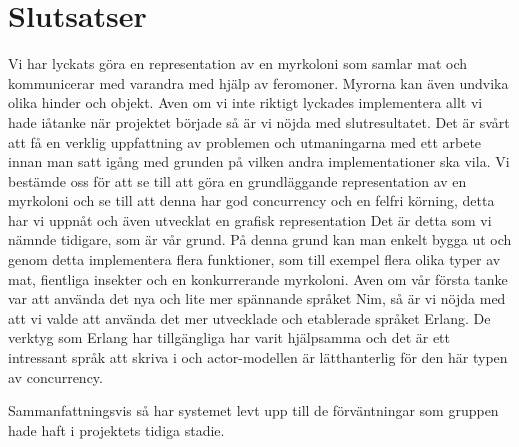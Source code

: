 \documentclass[12pt]{article}
\begin{document}
\section{Slutsatser}
Vi har lyckats göra en representation av en myrkoloni som samlar mat och kommunicerar med varandra med hjälp av feromoner.
Myrorna kan även undvika olika hinder och objekt.
Aven om vi inte riktigt lyckades implementera allt vi hade iåtanke när projektet började så är vi nöjda med slutresultatet.
Det är svårt att få en verklig uppfattning av problemen och utmaningarna med ett arbete innan man satt igång med grunden på vilken andra implementationer ska vila.
Vi bestämde oss för att se till att göra en grundläggande representation av en myrkoloni och se till att denna har god concurrency och en felfri körning,
detta har vi uppnåt och även utvecklat en grafisk representation Det är detta som vi nämnde tidigare, som är vår grund.
På denna grund kan man enkelt bygga ut och genom detta implementera flera funktioner,
som till exempel flera olika typer av mat, fientliga insekter och en konkurrerande myrkoloni.
Aven om vår första tanke var att använda det nya och lite mer spännande språket Nim,
så är vi nöjda med att vi valde att använda det mer utvecklade och etablerade språket Erlang.
De verktyg som Erlang har tillgängliga har varit hjälpsamma och det är ett intressant språk att skriva i och actor-modellen är lätthanterlig för den här typen av concurrency.

Sammanfattningsvis så har systemet levt upp till de förväntningar som gruppen hade haft i projektets tidiga stadie.



\end{document}
